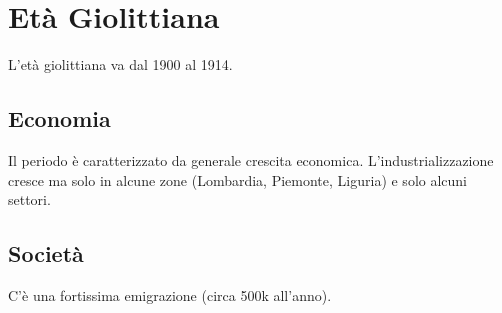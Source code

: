 
\section{Età Giolittiana}
L'età giolittiana va dal 1900 al 1914.

\subsection{Economia}
Il periodo è caratterizzato da generale crescita economica. L'industrializzazione cresce ma solo in
alcune zone (Lombardia, Piemonte, Liguria) e solo alcuni settori.

\subsection{Società}
C'è una fortissima emigrazione (circa 500k all'anno).

